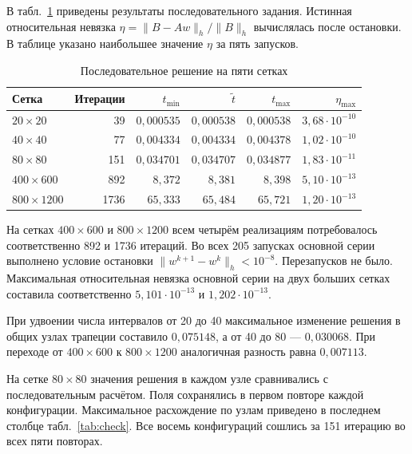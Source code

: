 \documentclass[a4paper,12pt]{extarticle}
\begin{document}
В табл.~\ref{tab:seq} приведены результаты последовательного задания. Истинная относительная невязка $\eta=\|B-Aw\|_h/\|B\|_h$ вычислялась после остановки. В таблице указано наибольшее значение $\eta$ за пять запусков.

\begin{table}[!htbp]
    \centering
    \begin{singlespace}
    \small
    \setlength{\tabcolsep}{4.5pt}
    \begin{tabular}{lrrrrr}
        \toprule
        Сетка & Итерации & $t_{\min}$ & $\tilde t$ & $t_{\max}$ & $\eta_{\max}$\\
        \midrule
        $20\times20$ & 39 & $0{,}000535$ & $0{,}000538$ & $0{,}000538$ & $3{,}68\cdot10^{-10}$\\
        $40\times40$ & 77 & $0{,}004334$ & $0{,}004334$ & $0{,}004378$ & $1{,}02\cdot10^{-10}$\\
        $80\times80$ & 151 & $0{,}034701$ & $0{,}034707$ & $0{,}034877$ & $1{,}83\cdot10^{-11}$\\
        $400\times600$ & 892 & $8{,}372$ & $8{,}381$ & $8{,}398$ & $5{,}10\cdot10^{-13}$\\
        $800\times1200$ & 1736 & $65{,}333$ & $65{,}484$ & $65{,}721$ & $1{,}20\cdot10^{-13}$\\
        \bottomrule
    \end{tabular}
    \end{singlespace}
    \caption{Последовательное решение на пяти сетках}
    \label{tab:seq}
\end{table}

На сетках $400\times600$ и $800\times1200$ всем четырём реализациям потребовалось соответственно 892 и 1736 итераций. Во всех 205 запусках основной серии выполнено условие остановки $\|w^{k+1}-w^k\|_h<10^{-8}$. Перезапусков не было. Максимальная относительная невязка основной серии на двух больших сетках составила соответственно $5{,}101\cdot 10^{-13}$ и $1{,}202\cdot10^{-13}$.

При удвоении числа интервалов от 20 до 40 максимальное изменение решения в общих узлах трапеции составило $0{,}075148$, а от 40 до 80 --- $0{,}030068$. При переходе от $400\times600$ к $800\times1200$ аналогичная разность равна $0{,}007113$.

На сетке $80\times80$ значения решения в каждом узле сравнивались с последовательным расчётом. Поля сохранялись в первом повторе каждой конфигурации. Максимальное расхождение по узлам приведено в последнем столбце табл.~\ref{tab:check}. Все восемь конфигураций сошлись за 151 итерацию во всех пяти повторах.
\end{document}
